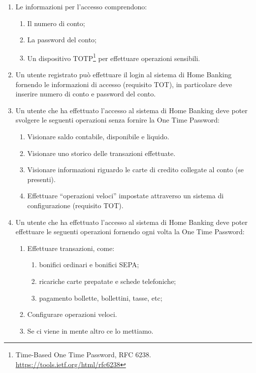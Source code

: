\begin{enumerate}
		Un utente non pre-registrato pu\`o effettuare la procedura completa di registrazione presso una filiale, fornendo le stesse informazioni richieste agli utenti che si pre-registrano online.
	\item Le informazioni per l'accesso comprendono:
		\begin{enumerate}
			\item Il numero di conto;
			\item La password del conto;
			\item Un dispositivo TOTP\footnote{Time-Based One Time Password, RFC 6238. \url{https://tools.ietf.org/html/rfc6238}} per effettuare operazioni sensibili.
		\end{enumerate}
	\item Un utente registrato pu\`o effettuare il login al sistema di Home Banking fornendo le informazioni di accesso (requisito TOT), in particolare deve inserire numero di conto e password del conto.
	\item Un utente che ha effettuato l'accesso al sistema di Home Banking deve poter svolgere le seguenti operazioni senza fornire la One Time Password:
		\begin{enumerate}
			\item Visionare saldo contabile, disponibile e liquido.
			\item Visionare uno storico delle transazioni effettuate.
			\item Visionare informazioni riguardo le carte di credito collegate al conto (se presenti).
			\item Effettuare ``operazioni veloci'' impostate attraverso un sistema di configurazione (requisito TOT).
		\end{enumerate}
	\item Un utente che ha effettuato l'accesso al sistema di Home Banking deve poter effettuare le seguenti operazioni fornendo ogni volta la One Time Password:
		\begin{enumerate}
			\item Effettuare transazioni, come:
				\begin{enumerate}
					\item bonifici ordinari e bonifici SEPA;
					\item ricariche carte prepatate e schede telefoniche;
					\item pagamento bollette, bollettini, tasse, etc;
				\end{enumerate}
			\item Configurare operazioni veloci.
			\item Se ci viene in mente altro ce lo mettiamo.

\end{enumerate}
\end{enumerate}
